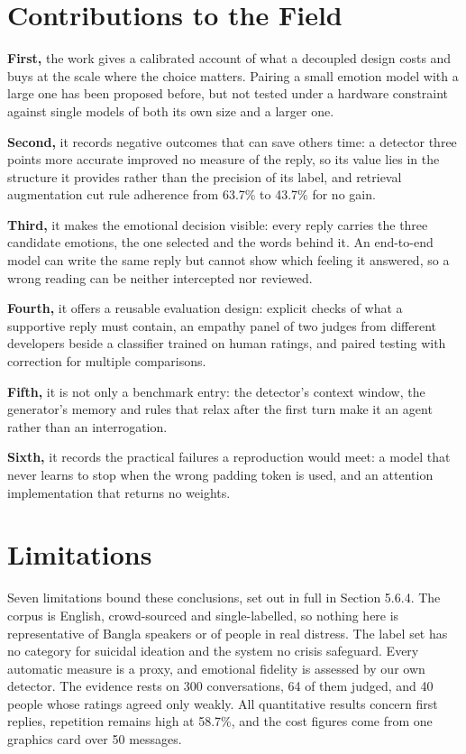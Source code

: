 \section{Contributions to the Field}
\label{sec:6.2}

\textbf{First,} the work gives a calibrated account of what a decoupled design costs and buys at the scale where the choice matters. Pairing a small emotion model with a large one has been proposed before, but not tested under a hardware constraint against single models of both its own size and a larger one.

\textbf{Second,} it records negative outcomes that can save others time: a detector three points more accurate improved no measure of the reply, so its value lies in the structure it provides rather than the precision of its label, and retrieval augmentation cut rule adherence from 63.7\% to 43.7\% for no gain.

\textbf{Third,} it makes the emotional decision visible: every reply carries the three candidate emotions, the one selected and the words behind it. An end-to-end model can write the same reply but cannot show which feeling it answered, so a wrong reading can be neither intercepted nor reviewed.

\textbf{Fourth,} it offers a reusable evaluation design: explicit checks of what a supportive reply must contain, an empathy panel of two judges from different developers beside a classifier trained on human ratings, and paired testing with correction for multiple comparisons.

\textbf{Fifth,} it is not only a benchmark entry: the detector's context window, the generator's memory and rules that relax after the first turn make it an agent rather than an interrogation.

\textbf{Sixth,} it records the practical failures a reproduction would meet: a model that never learns to stop when the wrong padding token is used, and an attention implementation that returns no weights.

\section{Limitations}
\label{sec:6.3}

Seven limitations bound these conclusions, set out in full in Section 5.6.4. The corpus is English, crowd-sourced and single-labelled, so nothing here is representative of Bangla speakers or of people in real distress. The label set has no category for suicidal ideation and the system no crisis safeguard. Every automatic measure is a proxy, and emotional fidelity is assessed by our own detector. The evidence rests on 300 conversations, 64 of them judged, and 40 people whose ratings agreed only weakly. All quantitative results concern first replies, repetition remains high at 58.7\%, and the cost figures come from one graphics card over 50 messages.

